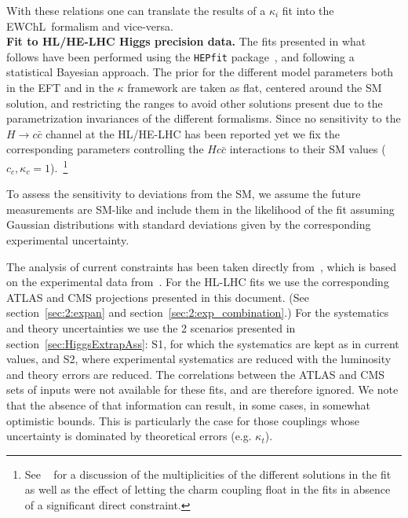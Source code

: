 %
With these relations one can translate the results of a $\kappa_i$ fit into the EWChL~formalism and vice-versa. \\

\noindent
{\bf Fit to HL/HE-LHC Higgs precision data.}
The fits presented in what follows have been performed using the {\tt HEPfit} package~\cite{hepfit,hepfitsite}, and following a statistical Bayesian approach.  
 The prior for the different model parameters both in the EFT and in the $\kappa$ framework are taken as flat, centered around the SM solution, and restricting the ranges to avoid other solutions present due to the parametrization invariances of the different formalisms.
Since no sensitivity to the $H\to c\bar{c}$ channel at the HL/HE-LHC has been reported yet we fix the corresponding parameters controlling the $Hc\bar c$ interactions to their SM values ($c_c,\kappa_c=1$).~\footnote{See ~\cite{deBlas:2018tjm} for a discussion of the multiplicities of the different solutions in the fit as well as the effect of letting the charm coupling float in the fits in absence of a significant direct constraint.}

To assess the sensitivity to deviations from the SM, we assume the future measurements are SM-like and include them in the likelihood of the fit assuming Gaussian distributions with standard deviations given by the corresponding experimental uncertainty. 

The analysis of current constraints has been taken directly from~\cite{deBlas:2018tjm}, which is based on the experimental data from~\cite{Aaltonen:2013ipa,Abazov:2013gmz,Chatrchyan:2013iaa,Chatrchyan:2013vaa,Chatrchyan:2013zna,Aad:2014eha,Aad:2014eva,Aad:2014xzb,ATLAS:2014aga,Chatrchyan:2014nva,Khachatryan:2014ira,Khachatryan:2014jba,Khachatryan:2014qaa,Aad:2015gba,Aad:2015gra,Aad:2015ona,Aad:2015vsa,ATLAS:2016gld,CMS:2016mmc,Khachatryan:2016vau,Aaboud:2017jvq,Aaboud:2017ojs,Aaboud:2017rss,Aaboud:2017uhw,Aaboud:2017vzb,Aaboud:2017xsd,CMS:2017rli,CMS-PAS-HIG-17-007,CMS-PAS-HIG-17-019,Sirunyan:2017elk,Sirunyan:2017exp,Sirunyan:2017khh,Aaboud:2018xdt,ATLAS-CONF-2018-004,Sirunyan:2018egh,Sirunyan:2018mvw,Sirunyan:2018shy,Sirunyan:2018ygk}. 
For the HL-LHC fits we use the corresponding ATLAS and CMS projections presented in this document. (See section~\ref{sec:2:expan} and section~\ref{sec:2:exp_combination}.)  For the systematics and theory uncertainties we use the 2 scenarios presented in section~\ref{sec:HiggsExtrapAss}: S1, for which the systematics are kept as in current values, and S2, where experimental systematics are reduced with the luminosity and theory errors are reduced.
%
The correlations between the ATLAS and CMS sets of inputs were not available for these fits, and are therefore ignored. We note that the absence of that information can result, in some cases, in somewhat optimistic bounds. This is particularly the case for those couplings whose uncertainty is dominated by theoretical errors (e.g. $\kappa_t$).

